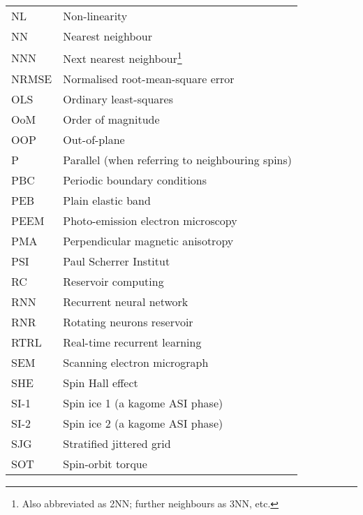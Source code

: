 {\begin{longtable}[l]{ll}
        NL    & Non-linearity                               \\
        NN    & Nearest neighbour                           \\
        NNN   & Next nearest neighbour\footnote{Also abbreviated as 2NN; further neighbours as 3NN, etc.} \\
        NRMSE & Normalised root-mean-square error           \\
        OLS   & Ordinary least-squares                      \\
        OoM   & Order of magnitude                          \\
        OOP   & Out-of-plane                                \\
        P     & Parallel (when referring to neighbouring spins) \\
        PBC   & Periodic boundary conditions                \\
        PEB   & Plain elastic band                          \\
        PEEM  & Photo-emission electron microscopy          \\
        PMA   & Perpendicular magnetic anisotropy           \\
        PSI   & Paul Scherrer Institut                      \\
        RC    & Reservoir computing                         \\
        RNN   & Recurrent neural network                    \\
        RNR   & Rotating neurons reservoir                  \\
        RTRL  & Real-time recurrent learning                \\
        SEM   & Scanning electron micrograph                \\
        SHE   & Spin Hall effect                            \\
        SI-1  & Spin ice 1 (a kagome ASI phase)             \\
        SI-2  & Spin ice 2 (a kagome ASI phase)             \\
        SJG   & Stratified jittered grid                    \\
        SOT   & Spin-orbit torque                           \\

\end{longtable}}
